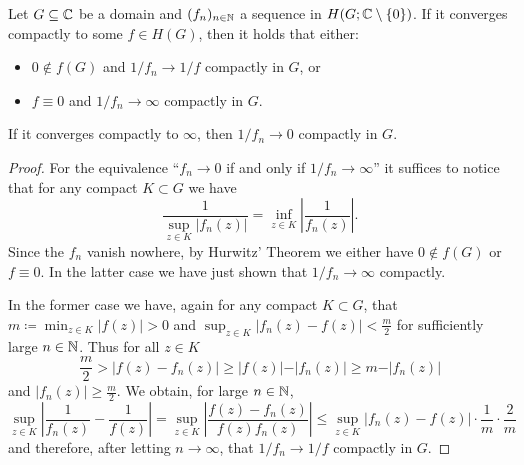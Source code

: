 \begin{lemma} \label{lem:compact-convergence-reciprocals}
Let $G \subseteq \mathbb{C}$ be a domain and $(f_n)_{n \in \mathbb{N}}$ a sequence in $H(G; \mathbb{C} \setminus \{ 0 \})$. If it converges compactly to some $f \in H(G)$, then it holds that either:
\begin{itemize}
    \item $0 \notin f(G)$ and $1 / f_n \to 1 / f$ compactly in $G$, or
    \item $f \equiv 0$ and $1 / f_n \to \infty$ compactly in $G$.
\end{itemize}
If it converges compactly to $\infty$, then $1 / f_n \to 0$ compactly in $G$.
\end{lemma}

\begin{proof}
    For the equivalence ``$f_n \to 0$ if and only if $1 / f_n \to \infty$'' it suffices to notice that for any compact $K \subset G$ we have
    \begin{equation*}
        \frac{1}{\sup_{z \in K} \vert f_n(z) \vert} = \inf_{z \in K} \left\vert \frac{1}{f_n(z)} \right\vert.
    \end{equation*}
    Since the $f_n$ vanish nowhere, by Hurwitz' Theorem we either have $0 \notin f(G)$ or $f \equiv 0$. In the latter case we have just shown that $1 / f_n \to \infty$ compactly.

    In the former case we have, again for any compact $K \subset G$, that $m \coloneqq \min_{z \in K} \vert f(z) \vert > 0$ and $\sup_{z \in K} \vert f_n(z) - f(z) \vert < \frac{m}{2}$ for sufficiently large $n \in \mathbb{N}$. Thus for all $z \in K$
    \begin{equation*}
        \frac{m}{2} > \vert f(z) - f_n(z) \vert \geq \vert f(z) \vert - \vert f_n(z) \vert \geq  m - \vert f_n(z) \vert
    \end{equation*}
    and $\vert f_n(z) \vert \geq \frac{m}{2}$. We obtain, for large $n \in \mathbb{N}$,
    \begin{equation*}
        \sup_{z \in K} \left\vert \frac{1}{f_n(z)} - \frac{1}{f(z)} \right\vert = \sup_{z \in K} \left\vert \frac{f(z) - f_n(z)}{f(z) f_n(z)} \right\vert \leq \sup_{z \in K} \left\vert f_n(z) - f(z) \right\vert \cdot \frac{1}{m} \cdot \frac{2}{m}
    \end{equation*}
    and therefore, after letting $n \to \infty$, that $1 / f_n \to 1 / f$ compactly in $G$.
\end{proof}


